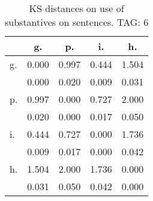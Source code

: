 \begin{table}[h!]
\begin{center}
\begin{tabular}{| l | c | c | c | c |}\hline
 & g. & p. & i. & h. \\\hline
g. & 0.000  & 0.997  & 0.444  & 1.504 \\\hline
 & 0.000  & 0.020  & 0.009  & 0.031 \\\hline
p. & 0.997  & 0.000  & 0.727  & 2.000 \\\hline
 & 0.020  & 0.000  & 0.017  & 0.050 \\\hline
i. & 0.444  & 0.727  & 0.000  & 1.736 \\\hline
 & 0.009  & 0.017  & 0.000  & 0.042 \\\hline
h. & 1.504  & 2.000  & 1.736  & 0.000 \\\hline
 & 0.031  & 0.050  & 0.042  & 0.000 \\\hline
\end{tabular}
\caption{KS distances on use of substantives on sentences. TAG: 6}
\end{center}
\end{table}